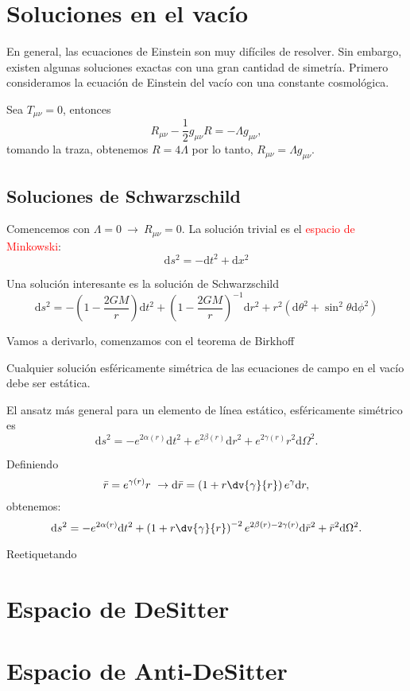 \documentclass[../main]{subfiles}
\begin{document}
\section{Soluciones en el vacío}

En general, las ecuaciones de Einstein son muy difíciles de resolver. Sin embargo, existen algunas soluciones exactas con una gran cantidad de simetría. Primero consideramos la ecuación de Einstein del vacío con una constante cosmológica.

Sea $T_{\mu\nu}=0$, entonces 
\begin{equation}
    R_{\mu\nu}-\dfrac{1}{2}g_{\mu\nu}R=-\Lambda g_{\mu\nu},
\end{equation}
tomando la traza, obtenemos $R=4\Lambda$ por lo tanto, $R_{\mu\nu} = \Lambda g_{\mu\nu}$.

\subsection{Soluciones de Schwarzschild}

Comencemos con $\Lambda = 0 \ \rightarrow \ R_{\mu\nu}=0$. La solución trivial es el \textcolor{red}{espacio de Minkowski}:
\begin{equation}
    \mathrm{d}s^2=-\mathrm{d}t^2+\mathrm{d}x^2
\end{equation}

Una solución interesante es la solución de Schwarzschild
\begin{equation}
    \mathrm{d}s^2 = -\left(1-\dfrac{2GM}{r}\right)\mathrm{d}t^2+\left(1-\dfrac{2GM}{r}\right)^{-1}\mathrm{d}r^2+r^2(\mathrm{d}\theta^2+\sin^2 \theta \mathrm{d}\phi^2)
\end{equation}

Vamos a derivarlo, comenzamos con el teorema de Birkhoff

 Cualquier solución esféricamente simétrica de las ecuaciones de campo en el vacío debe ser estática.

El ansatz más general para un elemento de línea estático, esféricamente simétrico es 
\begin{equation}
    \mathrm{d}s^2= -e^{2\alpha(r)}\mathrm{d}t^2+e^{2\beta(r)}\mathrm{d}r^2+e^{2\gamma(r)}r^2\mathrm{d}\Omega^2.
\end{equation}

Definiendo
\begin{equation}
    \bar{r}=e^{\gamma(r)}r \ \rightarrow \mathrm{d}\bar{r}=\left(1+r\dv{\gamma}{r}\right)e^{\gamma}\mathrm{d}r,
\end{equation}
obtenemos:
\begin{equation}
    \mathrm{d}s^2=-e^{2\alpha(r)}\mathrm{d}t^2+\left(1+r\dv{\gamma}{r}\right)^{-2}e^{2\beta(r)-2\gamma(r)}\mathrm{d}\bar{r}^2+\bar{r}^2\mathrm{d}\Omega^2.
\end{equation}

Reetiquetando 

\section{Espacio de DeSitter}

\section{Espacio de Anti-DeSitter}
\end{document}
